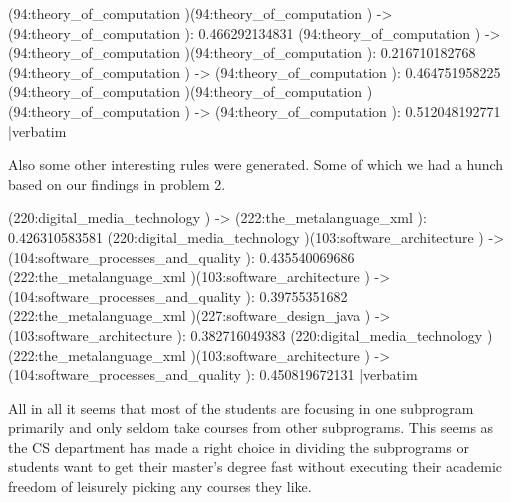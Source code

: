 \verbatim
(94:theory_of_computation )(94:theory_of_computation ) -> (94:theory_of_computation ): 0.466292134831
(94:theory_of_computation ) -> (94:theory_of_computation )(94:theory_of_computation ): 0.216710182768
(94:theory_of_computation ) -> (94:theory_of_computation ): 0.464751958225
(94:theory_of_computation )(94:theory_of_computation )(94:theory_of_computation ) -> (94:theory_of_computation ): 0.512048192771
|verbatim

Also some other interesting rules were generated. Some of which we had a hunch based on our findings in problem 2.

\verbatim
(220:digital_media_technology ) -> (222:the_metalanguage_xml ): 0.426310583581
(220:digital_media_technology )(103:software_architecture ) -> (104:software_processes_and_quality ): 0.435540069686
(222:the_metalanguage_xml )(103:software_architecture ) -> (104:software_processes_and_quality ): 0.39755351682
(222:the_metalanguage_xml )(227:software_design_java ) -> (103:software_architecture ): 0.382716049383
(220:digital_media_technology )(222:the_metalanguage_xml )(103:software_architecture ) -> (104:software_processes_and_quality ): 0.450819672131
|verbatim

All in all it seems that most of the students are focusing in one subprogram primarily and only seldom take courses
from other subprograms. This seems as the CS department has made a right choice in dividing the subprograms or
students want to get their master's degree fast without executing their academic freedom of leisurely picking
any courses they like.